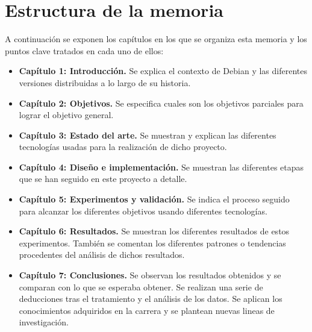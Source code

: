 \documentclass[a4paper, 12pt]{book}
\begin{document}
\section{Estructura de la memoria}
\label{sec:estructura}

A continuación se exponen los capítulos en los que se organiza esta memoria y los puntos clave tratados en cada uno de ellos:


\begin{itemize}
  \item \textbf {Capítulo 1: Introducción.} Se explica el contexto de Debian y las diferentes versiones distribuidas a lo largo de su historia.
  
  \item \textbf {Capítulo 2: Objetivos.} Se especifica cuales son los objetivos parciales para lograr el objetivo general.
  
  \item \textbf {Capítulo 3: Estado del arte.} Se muestran y explican las diferentes tecnologías usadas para la realización de dicho proyecto.
  
  \item \textbf {Capítulo 4: Diseño e implementación.} Se muestran las diferentes etapas que se han seguido en este proyecto a detalle.
  
  \item \textbf {Capítulo 5: Experimentos y validación.} Se indica el proceso seguido para alcanzar los diferentes objetivos usando diferentes tecnologías.
  
  \item \textbf {Capítulo 6: Resultados.} Se muestran los diferentes resultados de estos experimentos. También se comentan los diferentes patrones o tendencias procedentes del análisis de dichos resultados.
  
  \item \textbf {Capítulo 7: Conclusiones.} Se observan los resultados obtenidos y se comparan con lo que se esperaba obtener. Se realizan una serie de deducciones tras el tratamiento y el análisis de los datos. Se aplican los conocimientos adquiridos en la carrera y se plantean nuevas lineas de investigación.
  
\end{itemize}





\end{document}
